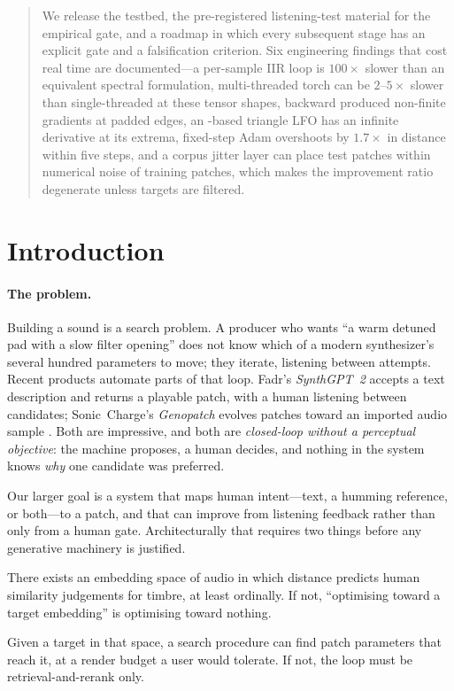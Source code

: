 \documentclass[11pt]{article}
\newcommand{\code}[1]{\texttt{\detokenize{#1}}}
\begin{document}
\begin{abstract}
We release the testbed, the pre-registered listening-test material for the
empirical gate, and a roadmap in which every subsequent stage has an explicit
gate and a falsification criterion. Six engineering findings that cost real
time are documented---a per-sample IIR loop is $100\times$ slower than an
equivalent spectral formulation, multi-threaded torch can be $2$--$5\times$
slower than single-threaded at these tensor shapes, \code{torch.istft} backward
produced non-finite gradients at padded edges, an \code{asin}-based triangle LFO
has an infinite derivative at its extrema, fixed-step Adam overshoots by
$1.7\times$ in distance within five steps, and a corpus jitter layer can place
test patches within numerical noise of training patches, which makes the
improvement ratio degenerate unless targets are filtered.
\end{abstract}

\section{Introduction}\label{sec:intro}

\paragraph{The problem.}
Building a sound is a search problem. A producer who wants ``a warm detuned pad
with a slow filter opening'' does not know which of a modern synthesizer's
several hundred parameters to move; they iterate, listening between attempts.
Recent products automate parts of that loop. Fadr's \emph{SynthGPT~2} accepts a
text description and returns a playable patch, with a human listening between
candidates; Sonic~Charge's \emph{Genopatch} evolves patches toward an imported
audio sample \cite{fadr,genopatch}. Both are impressive, and both are
\emph{closed-loop without a perceptual objective}: the machine proposes, a human
decides, and nothing in the system knows \emph{why} one candidate was preferred.

Our larger goal is a system that maps human intent---text, a humming reference,
or both---to a patch, and that can improve from listening feedback rather than
only from a human gate. Architecturally that requires two things before any
generative machinery is justified.

\begin{description}[leftmargin=1.2em]
\item[Assumption A (perceptual monotonicity).] There exists an embedding space
  of audio in which distance predicts human similarity judgements for timbre,
  at least ordinally. If not, ``optimising toward a target embedding'' is
  optimising toward nothing.
\item[Assumption B (navigability).] Given a target in that space, a search
  procedure can find patch parameters that reach it, at a render budget a user
  would tolerate. If not, the loop must be retrieval-and-rerank only.
\end{description}
\end{document}
